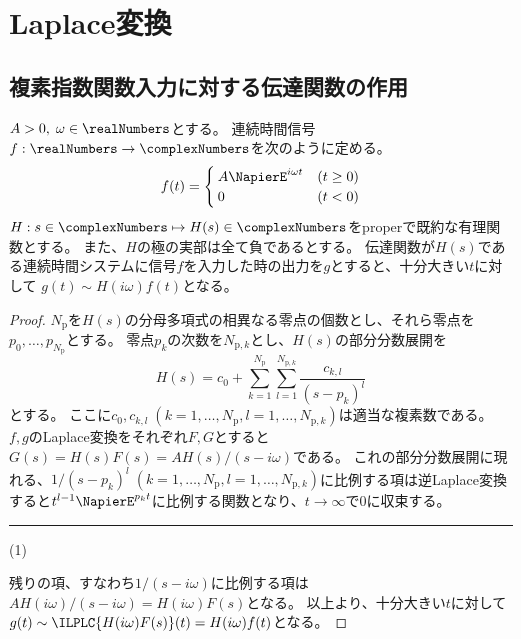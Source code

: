 \part{Laplace変換}
	\chapter{複素指数関数入力に対する伝達関数の作用}
		\begin{shadebox}
			$A>0,\;\omega \in \realNumbers$とする。
			連続時間信号$f: \realNumbers \to \complexNumbers$を次のように定める。
			\[
				f(t) =
				\begin{cases}
					A\NapierE^{i\omega t} & (t\geq 0) \\
					0 & (t<0)
				\end{cases}
			\]
			$H: s\in\complexNumbers \mapsto H(s) \in \complexNumbers$をproperで既約な有理関数とする。
			また、$H$の極の実部は全て負であるとする。
			伝達関数が$H(s)$である連続時間システムに信号$f$を入力した時の出力を$g$とすると、十分大きい$t$に対して
			$g(t) \sim H(i\omega)f(t)$となる。
		\end{shadebox}
		\begin{proof}
			\quad\par
			$N_\text{p}$を$H(s)$の分母多項式の相異なる零点の個数とし、それら零点を$p_0,\dots,p_{N_\text{p}}$とする。
			零点$p_k$の次数を$N_{\text{p},k}$とし、$H(s)$の部分分数展開を
			\[ H(s) = c_0 + \sum_{k=1}^{N_\mathrm{p}} \sum_{l=1}^{N_{\mathrm{p},k}} \frac{c_{k,l}}{(s-p_k)^l} \]
			とする。
			ここに$c_0,c_{k,l}\;(k=1,\dots,N_\mathrm{p},l=1,\dots,N_{\mathrm{p},k})$は適当な複素数である。
			$f,g$のLaplace変換をそれぞれ$F,G$とすると$G(s) = H(s)F(s) = A H(s)/(s-i\omega)$である。
			これの部分分数展開に現れる、$1/(s-p_k)^l\;(k=1,\dots,N_\mathrm{p},l=1,\dots,N_{\mathrm{p},k})$に比例する項は逆Laplace変換すると$t^{l-1}\NapierE^{p_k t}$に比例する関数となり、$t\to\infty$で0に収束する。\hfill \rule{10cm}{0.4pt}(1)
			\par
			残りの項、すなわち$1/(s-i\omega)$に比例する項は$AH(i\omega)/(s-i\omega) = H(i\omega)F(s)$となる。
			以上より、十分大きい$t$に対して$g(t) \sim \ILPLC{H(i\omega)F(s)}(t) = H(i\omega)f(t)$となる。
		\end{proof}
